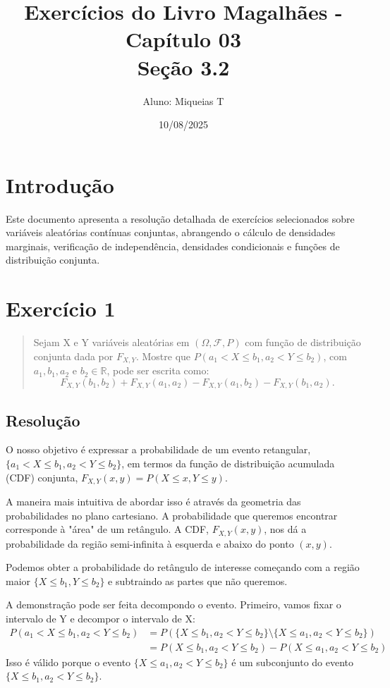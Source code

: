 \documentclass[12pt]{article}
\title{Exercícios do Livro Magalhães - Capítulo 03\\\large{Seção 3.2}}
\author{Aluno: Miqueias T}
\date{10/08/2025}
\begin{document}
\maketitle

\section*{Introdução}
Este documento apresenta a resolução detalhada de exercícios selecionados sobre variáveis aleatórias contínuas conjuntas, abrangendo o cálculo de densidades marginais, verificação de independência, densidades condicionais e funções de distribuição conjunta.

\section{Exercício 1}

\begin{quote}
Sejam X e Y variáveis aleatórias em $(\Omega, \mathcal{F}, P)$ com função de distribuição conjunta dada por $F_{X,Y}$. Mostre que $P(a_1 < X \le b_1, a_2 < Y \le b_2)$, com $a_1, b_1, a_2$ e $b_2 \in \mathbb{R}$, pode ser escrita como:
\[ F_{X,Y}(b_1, b_2) + F_{X,Y}(a_1, a_2) - F_{X,Y}(a_1, b_2) - F_{X,Y}(b_1, a_2). \]
\end{quote}

\subsection*{Resolução}

O nosso objetivo é expressar a probabilidade de um evento retangular, $\{a_1 < X \le b_1, a_2 < Y \le b_2\}$, em termos da função de distribuição acumulada (CDF) conjunta, $F_{X,Y}(x,y) = P(X \le x, Y \le y)$.

A maneira mais intuitiva de abordar isso é através da geometria das probabilidades no plano cartesiano. A probabilidade que queremos encontrar corresponde à "área" de um retângulo. A CDF, $F_{X,Y}(x,y)$, nos dá a probabilidade da região semi-infinita à esquerda e abaixo do ponto $(x,y)$.

Podemos obter a probabilidade do retângulo de interesse começando com a região maior $\{X \le b_1, Y \le b_2\}$ e subtraindo as partes que não queremos.

A demonstração pode ser feita decompondo o evento. Primeiro, vamos fixar o intervalo de Y e decompor o intervalo de X:
\begin{align*}
P(a_1 < X \le b_1, a_2 < Y \le b_2) &= P(\{X \le b_1, a_2 < Y \le b_2\} \setminus \{X \le a_1, a_2 < Y \le b_2\}) \\
&= P(X \le b_1, a_2 < Y \le b_2) - P(X \le a_1, a_2 < Y \le b_2)
\end{align*}
Isso é válido porque o evento $\{X \le a_1, a_2 < Y \le b_2\}$ é um subconjunto do evento $\{X \le b_1, a_2 < Y \le b_2\}$.
\end{document}
